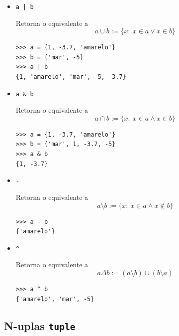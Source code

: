 \begin{itemize}
\item \lstinline+a | b+ 

  Retorna o \PYTHONset equivalente a
  \begin{equation}
    a \cup b := \{x:~x\in a \lor x\in b\}
  \end{equation}

  
\begin{lstlisting}[xrightmargin=2.5em]
>>> a = {1, -3.7, 'amarelo'}
>>> b = {'mar', -5}
>>> a | b
{1, 'amarelo', 'mar', -5, -3.7}
\end{lstlisting}

\item \lstinline+a & b+ 
  
  Retorna o \PYTHONset equivalente a
  \begin{equation}
    a \cap b := \{x:~x\in a \land x\in b\}
  \end{equation}

\begin{lstlisting}[xrightmargin=2.5em]
>>> a = {1, -3.7, 'amarelo'}
>>> b = {'mar', 1, -3.7, -5}
>>> a & b
{1, -3.7}
\end{lstlisting}

\item \lstinline+-+ 

  Retorna o \PYTHONset equivalente a
  \begin{equation}
    a \setminus b := \{x:~x\in a \land x\not\in b\}
  \end{equation}

\begin{lstlisting}[xrightmargin=2.5em]
>>> a - b
{'amarelo'}
\end{lstlisting}

\item \lstinline+^+ 

  Retorna o \PYTHONset equivalente a
  \begin{equation}
    a \Delta b := (a\setminus b)\cup (b\setminus a)
  \end{equation}

\begin{lstlisting}[xrightmargin=2.5em]
>>> a ^ b
{'amarelo', 'mar', -5}
\end{lstlisting}
\end{itemize}

\subsection{N-uplas \texttt{tuple}}

